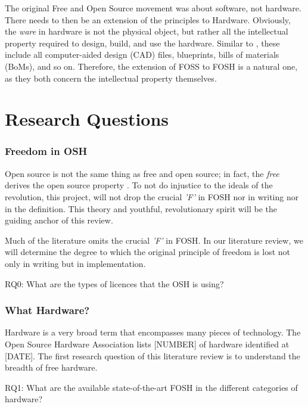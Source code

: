 \documentclass{article}
\begin{document}
The original Free and Open Source movement was about software, not hardware.
There needs to then be an extension of the principles to Hardware.
Obviously, the \textit{ware} in hardware is not the physical object, but rather all the intellectual property required to design, build, and use the hardware. 
Similar to \cite{p1_def_succ}, these include all computer-aided design (CAD) files, blueprints, bills of materials (BoMs), and so on. 
Therefore, the extension of FOSS to FOSH is a natural one, as they both concern the intellectual property themselves. 

\section{Research Questions}

\subsubsection{Freedom in OSH}
Open source is not the same thing as free and open source; in fact, the \textit{free} derives the open source property \cite{b0_stallman}. 
To not do injustice to the ideals of the revolution, this project, will not drop the crucial \textit{'F'} in FOSH nor in writing nor in the definition.
This theory and youthful, revolutionary spirit will be the guiding anchor of this review.

Much of the literature omits the crucial \textit{'F'} in FOSH.
In our literature review, we will determine the degree to which the original principle of freedom is lost not only in writing but in implementation.

RQ0: What are the types of licences that the OSH is using?

\subsubsection{What Hardware?}
\label{RQ1}
Hardware is a very broad term that encompasses many pieces of technology.
The Open Source Hardware Association lists [NUMBER] of hardware identified at [DATE].
The first research question of this literature review is to understand the breadth of free hardware.

RQ1: What are the available state-of-the-art FOSH in the different categories of hardware?
\end{document}
